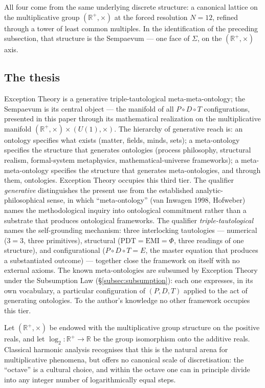 \documentclass[11pt,a4paper]{article}
\theoremstyle{definition}
\theoremstyle{remark}
\newcommand{\R}{\mathbb{R}}
\begin{document}
All four come from the same underlying discrete structure: a canonical lattice on the multiplicative group $(\R^{+},\times)$ at the forced resolution $N=12$, refined through a tower of least common multiples. In the identification of the preceding subsection, that structure is the Sempaevum --- one face of $\Sigma$, on the $(\R^{+},\times)$ axis.

\subsection{The thesis}

Exception Theory is a generative triple-tautological meta-meta-ontology; the Sempaevum is its central object --- the manifold of all $P\circ D\circ T$ configurations, presented in this paper through its mathematical realization on the multiplicative manifold $(\R^{+},\times) \times (U(1),\times)$. The hierarchy of generative reach is: an ontology specifies what exists (matter, fields, minds, sets); a meta-ontology specifies the structure that generates ontologies (process philosophy, structural realism, formal-system metaphysics, mathematical-universe frameworks); a meta-meta-ontology specifies the structure that generates meta-ontologies, and through them, ontologies. Exception Theory occupies this third tier. The qualifier \emph{generative} distinguishes the present use from the established analytic-philosophical sense, in which ``meta-ontology'' (van Inwagen 1998, Hofweber) names the methodological inquiry into ontological commitment rather than a substrate that produces ontological frameworks. The qualifier \emph{triple-tautological} names the self-grounding mechanism: three interlocking tautologies --- numerical ($3 = 3$, three primitives), structural ($\mathrm{PDT} = \mathrm{EMI} = \Phi$, three readings of one structure), and configurational ($P \circ D \circ T = E$, the master equation that produces a substantiated outcome) --- together close the framework on itself with no external axioms. The known meta-ontologies are subsumed by Exception Theory under the Subsumption Law (\S\ref{subsec:subsumption}): each one expresses, in its own vocabulary, a particular configuration of $(P, D, T)$ applied to the act of generating ontologies. To the author's knowledge no other framework occupies this tier.

Let $(\R^{+},\times)$ be endowed with the multiplicative group structure on the positive reals, and let $\log_{2}:\R^{+}\to\R$ be the group isomorphism onto the additive reals. Classical harmonic analysis recognises that this is the natural arena for multiplicative phenomena, but offers no canonical scale of discretisation: the ``octave'' is a cultural choice, and within the octave one can in principle divide into any integer number of logarithmically equal steps.
\end{document}
